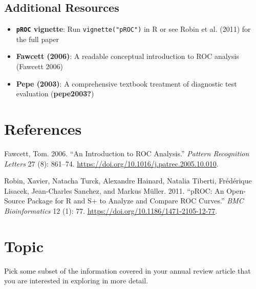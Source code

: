 \documentclass[
  letterpaper,
  DIV=11,
  numbers=noendperiod]{scrreprt}
\providecommand{\tightlist}{%
  \setlength{\itemsep}{0pt}\setlength{\parskip}{0pt}}\usepackage{longtable,booktabs,array}
\newlength{\cslhangindent}
\newenvironment{CSLReferences}[2] %
 {\begin{list}{}{%
  \setlength{\itemindent}{0pt}
  \setlength{\leftmargin}{0pt}
  \setlength{\parsep}{0pt}
  \ifodd #1
   \setlength{\leftmargin}{\cslhangindent}
   \setlength{\itemindent}{-1\cslhangindent}
  \fi
  \setlength{\itemsep}{#2\baselineskip}}}
 {\end{list}}
\begin{document}
\section{Additional Resources}\label{additional-resources}

\begin{itemize}
\tightlist
\item
  \textbf{\texttt{pROC} vignette}: Run \texttt{vignette("pROC")} in R or
  see Robin et al. (2011) for the full paper
\item
  \textbf{Fawcett (2006)}: A readable conceptual introduction to ROC
  analysis (Fawcett 2006)
\item
  \textbf{Pepe (2003)}: A comprehensive textbook treatment of diagnostic
  test evaluation (\textbf{pepe2003?})
\end{itemize}


\chapter*{References}\label{references}


\label{refs}
\begin{CSLReferences}{1}{0}
Fawcett, Tom. 2006. {``An Introduction to {ROC} Analysis.''}
\emph{Pattern Recognition Letters} 27 (8): 861--74.
\url{https://doi.org/10.1016/j.patrec.2005.10.010}.

Robin, Xavier, Natacha Turck, Alexandre Hainard, Natalia Tiberti,
Frédérique Lisacek, Jean-Charles Sanchez, and Markus Müller. 2011.
{``{pROC}: An Open-Source Package for {R} and {S}+ to Analyze and
Compare {ROC} Curves.''} \emph{BMC Bioinformatics} 12 (1): 77.
\url{https://doi.org/10.1186/1471-2105-12-77}.

\end{CSLReferences}

\cleardoublepage
{}
{}
\appendix

\chapter{Topic}\label{topic}

Pick some subset of the information covered in your annual review
article that you are interested in exploring in more detail.
\end{document}
